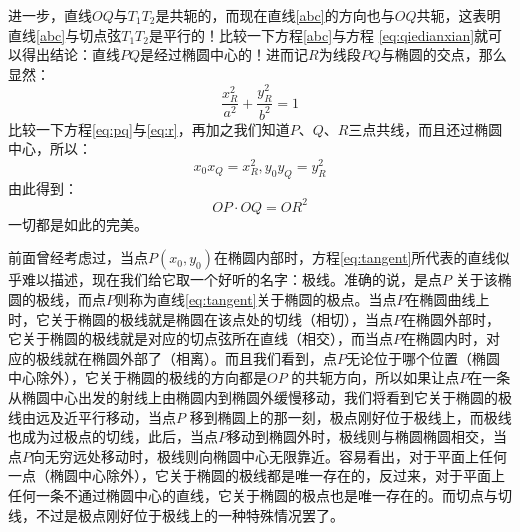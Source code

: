 进一步，直线$OQ$与$T_1T_2$是共轭的，而现在直线\ref{abc}的方向也与$OQ$共轭，这表明直线\ref{abc}与切点弦$T_1T_2$是平行的！比较一下方程\ref{abc}与方程
\ref{eq:qiedianxian}就可以得出结论：直线$PQ$是经过椭圆中心的！进而记$R$为线段$PQ$与椭圆的交点，那么显然：
\begin{equation}
\frac{x_R^2}{a^2}+\frac{y_R^2}{b^2}=1 \label{eq:r}
\end{equation}
比较一下方程\ref{eq:pq}与\ref{eq:r}，再加之我们知道$P$、$Q$、$R$三点共线，而且还过椭圆中心，所以：
\begin{equation}
x_0 x_Q=x_R^2,y_0 y_Q=y_R^2
\end{equation}
由此得到：
\begin{equation}
OP\cdot OQ = OR^2
\end{equation}
一切都是如此的完美。

前面曾经考虑过，当点$P(x_0,y_0)$在椭圆内部时，方程\ref{eq:tangent}所代表的直线似乎难以描述，现在我们给它取一个好听的名字：极线。准确的说，是点$P$ 关于该椭圆的极线，而点$P$则称为直线\ref{eq:tangent}关于椭圆的极点。当点$P$在椭圆曲线上时，它关于椭圆的极线就是椭圆在该点处的切线（相切），当点$P$在椭圆外部时，它关于椭圆的极线就是对应的切点弦所在直线（相交），而当点$P$在椭圆内时，对应的极线就在椭圆外部了（相离）。而且我们看到，点$P$无论位于哪个位置（椭圆中心除外），它关于椭圆的极线的方向都是$OP$ 的共轭方向，所以如果让点$P$在一条从椭圆中心出发的射线上由椭圆内到椭圆外缓慢移动，我们将看到它关于椭圆的极线由远及近平行移动，当点$P$ 移到椭圆上的那一刻，极点刚好位于极线上，而极线也成为过极点的切线，此后，当点$P$移动到椭圆外时，极线则与椭圆椭圆相交，当点$P$向无穷远处移动时，极线则向椭圆中心无限靠近。容易看出，对于平面上任何一点（椭圆中心除外），它关于椭圆的极线都是唯一存在的，反过来，对于平面上任何一条不通过椭圆中心的直线，它关于椭圆的极点也是唯一存在的。而切点与切线，不过是极点刚好位于极线上的一种特殊情况罢了。




